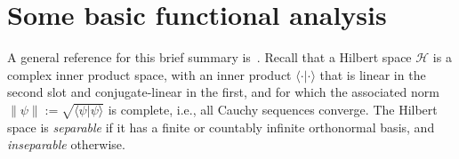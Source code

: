 \documentclass[12pt]{article}
\newcommand{\1}{\mathds{1}}                         %
\newcommand{\Hcal}{\mathcal {H}}
\newcommand{\Ocal}{\mathcal{O}}
\newcommand{\HH}{{\mathcal{H}}}
\newcommand{\ip}[2]{\langle #1|#2\rangle}
\newtheorem{exercise}[theorem]{Exercise}
\begin{document}





\appendix
\section{Some basic functional analysis}\label{appx:basic_fa}

A general reference for this brief summary is~\cite{ReedSimon:vol1}.
Recall that a Hilbert space $\HH$ is a complex inner product space, with an inner product $\ip{\cdot}{\cdot}$ that is linear in the second slot and conjugate-linear in the first, and for which the associated norm $\|\psi\|:=\sqrt{\ip{\psi}{\psi}}$ is complete, i.e., all Cauchy sequences converge. The Hilbert space is \emph{separable} if it has a finite or countably infinite orthonormal basis, and \emph{inseparable} otherwise.  
\end{document}
